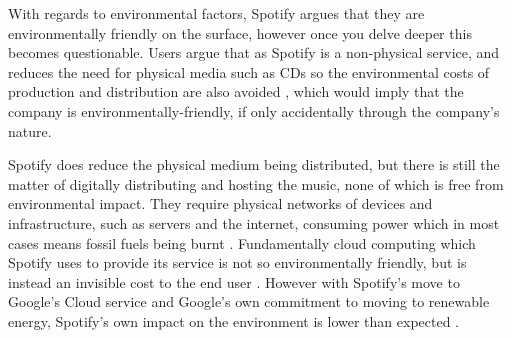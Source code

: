 \par
With regards to environmental factors, Spotify argues that they are environmentally friendly on the surface, however once you delve deeper this becomes questionable. Users argue that as Spotify is a non-physical service, and reduces the need for physical media such as CDs so the environmental costs of production and distribution are also avoided \parencite{spotify_green_pro}, which would imply that the company is environmentally-friendly, if only accidentally through the company's nature. 
\par
Spotify does reduce the physical medium being distributed, but there is still the matter of digitally distributing and hosting the music, none of which is free from environmental impact. They require physical networks of devices and infrastructure, such as servers and the internet, consuming power which in most cases means fossil fuels being burnt \parencite{world_energy_stats}. Fundamentally cloud computing which Spotify uses to provide its service is not so environmentally friendly, but is instead an invisible cost to the end user \parencite{internet_isnt_so_clean}. However with Spotify's move to Google's Cloud service and Google's own commitment to moving to renewable energy, Spotify's own impact on the environment is lower than expected \parencite{spotify_announce_google_cloud, google_renewable}.